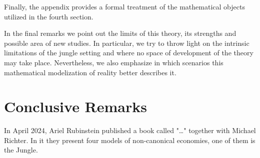 \documentclass[12pt,a4paper]{article}
\numberwithin{theorem}{section}
\numberwithin{definition}{section}
\numberwithin{example}{section}
\numberwithin{exercise}{section}
\begin{document}

Finally, the appendix provides a formal treatment of the mathematical objects utilized in the fourth section. 

In the final remarks we point out the limits of this theory, its strengths and possible area of new studies. In particular, we try to throw light on the intrinsic limitations of the jungle setting and where no space of development of the theory may take place. Nevertheless, we also emphasize in which scenarios this mathematical modelization of reality better describes it.   






\newpage



\newpage



\newpage



\newpage

\section{Conclusive Remarks}

In April 2024, Ariel Rubinstein published a book called "\dots" together with Michael Richter. In it they present four models of non-canonical economies, one of them is the Jungle. 

\newpage

\nocite{*}
\printbibliography[]

\newpage


\end{document}
